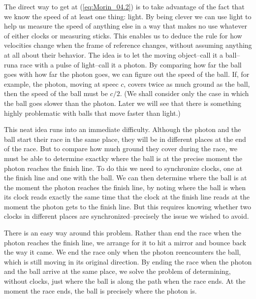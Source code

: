 The direct way to get at (\ref{eq:Morin_04.2}) is to take advantage of the fact that we know the speed of at least one thing: light. By being clever we can use light to help us measure the speed of anything else in a way that makes no use whatever of either clocks or measuring sticks. This enables us to  deduce the rule for how velocities change when the frame of reference changes, without assuming anything at all about their behavior. The idea is to let the moving object--call it a ball--runa  race with a pulse of light--call it a photon. By comparing how far the ball goes with how far the photon goes, we can figure out the speed of the ball. If, for example, the photon, moving at speec $c$, covers twice as much ground as the ball, then the speed of the ball must be $c/2$. (We shall consider only the case in which the ball goes slower than the photon. Later we will see that there is something highly problematic with balls that move faster than light.)

This neat idea runs into an immediate difficulty. Although the photon and the ball  start their race in the same place, they will be in different places at the end of the race. But to compare how much ground they cover during the race, we must be able to determine exactky where the ball is at the precise moment the photon reaches the finish line. To do this we need to synchronize clocks, one at the finish line and one with the ball. We can then determine where the ball is at the moment the photon reaches the finish line, by noting where the ball is when its clock reads exactly the same time that the clock at the finish line reads at the moment the photon gets to the finish line. But this requires knowing whether two clocks in different places are synchronized--precisely the issue we wished to avoid. 

There is an easy way around this problem. Rather than end the race when the photon reaches the finish line, we arrange for it to hit a mirror and bounce back the way it came. We end the race only when the photon reencounters the ball, which is still moving in its original direction. By ending the race when the photon and the ball arrive at the same place, we solve the problem of determining, without clocks, just where the ball is along the path when the race ends. At the moment the race ends, the ball is precisely where the photon is.

